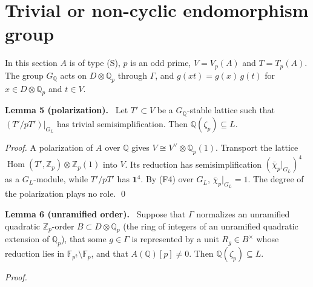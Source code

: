 \documentclass[11pt]{article}
\newenvironment{statement}[1]{\par\medskip\noindent\phantomsection\textbf{#1}\ }{\par\medskip}
\newcommand{\Q}{\mathbb Q}
\newcommand{\Z}{\mathbb Z}
\newcommand{\F}{\mathbb F}
\DeclareMathOperator{\Hom}{Hom}
\begin{document}
\section{Trivial or non-cyclic endomorphism group}\label{noncyclic}

In this section \(A\) is of type (S), \(p\) is an odd prime, \(V=V_p(A)\) and \(T=T_p(A)\). The group
      \(G_{\Q}\) acts on \(D\otimes\Q_p\) through \(\Gamma\), and \(g(xt)=g(x)\,g(t)\) for \(x\in D\otimes\Q_p\) and
      \(t\in V\).

\begin{statement}{Lemma 5 (polarization).}\label{lemma-a}
Let \(T'\subset V\) be a \(G_{\Q}\)-stable lattice such that \((T'/pT')|_{G_L}\) has trivial
          semisimplification. Then \(\Q(\zeta_p)\subseteq L\).
\end{statement}

\emph{Proof.} A polarization of \(A\) over \(\Q\) gives \(V\cong V^\vee\otimes\Q_p(1)\). Transport the
      lattice \(\Hom(T',\Z_p)\otimes\Z_p(1)\) into \(V\). Its reduction has semisimplification
      \((\bar\chi_p|_{G_L})^{4}\) as a \(G_L\)-module, while \(T'/pT'\) has \(\mathbf 1^4\). By (F4) over
      \(G_L\), \(\bar\chi_p|_{G_L}=1\). The degree of the polarization plays no role. \qed

\begin{statement}{Lemma 6 (unramified order).}\label{lemma-b}
Suppose that \(\Gamma\) normalizes an unramified quadratic \(\Z_p\)-order \(B\subset D\otimes\Q_p\)
          (the ring of integers of an unramified quadratic extension of \(\Q_p\)), that some \(g\in\Gamma\) is
          represented by a unit \(R_g\in B^\times\) whose reduction lies in \(\F_{p^2}\setminus\F_p\), and that
          \(A(\Q)[p]\neq0\). Then \(\Q(\zeta_p)\subseteq L\).
\end{statement}

\emph{Proof.}
\end{document}
